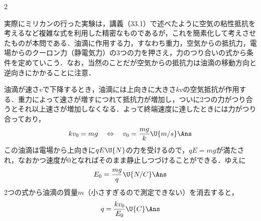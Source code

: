 \begin{multicols}{2}
\par\nopagebreak
\begin{sisin}
実際にミリカンの行った実験は，講義（33.1）で述べたように空気の粘性抵抗を考えるなど複雑な式を利用した精密なものであるが，これを簡素化して考えさせたものが本問である．油滴に作用する力，すなわち重力，空気からの抵抗力，電場からのクーロン力（静電気力）の3つの力を押さえ，力のつり合いの式から条件を定めていこう．なお，当然のことだが空気からの抵抗力は油滴の移動方向と逆向きにかかることに注意．
\end{sisin}
\KaiHead
\begin{komon}
 油滴が速さ$v$で下降するとき，油滴には上向きに大きさ$kv$の空気抵抗が作用する．重力によって速さが増すにつれて抵抗力が増加し，ついに2つの力がつり合うとそれ以上速さが増加しなくなる．よって終端速度に達したときには力がつり合っており，
       \[kv_0=mg\quad\Leftrightarrow\quad v_0=\frac{mg}{k}\U{m/s}\Ans\]
 この油滴は電場から上向きに$qE\U{N}$の力を受けるので，$qE=mg$が満たされ，なおかつ速度が$0$となればそのまま静止しつづけることができる．ゆえに
       \[E_0=\frac{mg}{q}\U{N/C}\Ans\]
 2つの式から油滴の質量$m$（小さすぎるので測定できない）を消去すると，
       \[q=\frac{kv_0}{E_0}\U{C}\Ans\]
\end{komon}


\end{multicols}
